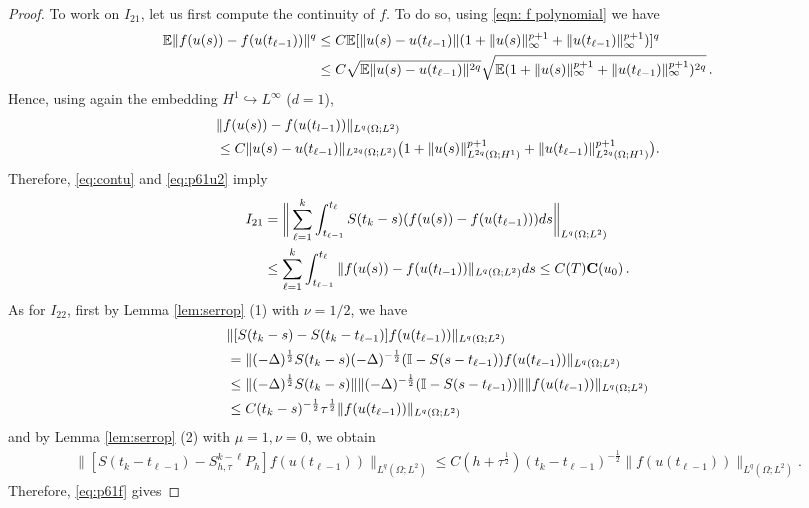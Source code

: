 \documentclass[reqno, 11pt]{amsart}
\theoremstyle{plain}
\theoremstyle{definition}
\theoremstyle{remark}
\numberwithin{equation}{section}
\numberwithin{theorem}{section}
\newcommand{\con}{\mathbf{C}}
\begin{document}
{\begin{proof}
To work on $I_{21}$,  let us first compute the continuity of $f$. To do so, using  \eqref{eqn: f polynomial} we have
\begin{align}
\mathbb{E}\|f(u(s))-f(u(t_{\ell-1}))\|^q &\leq 
C\mathbb{E}[\|u(s)-u(t_{\ell-1})\|(1+\|u(s)\|_\infty^{p+1}+\|u(t_{\ell-1})\|_\infty^{p+1})]^q\notag\\
&\leq C\sqrt{\mathbb{E}\|u(s)-u(t_{\ell-1})\|^{2q}}\sqrt{\mathbb{E}(1+\|u(s)\|_\infty^{p+1}+\|u(t_{\ell-1})\|_\infty^{p+1})^{2q}} \,.
\end{align}
Hence, using again the embedding $H^1\hookrightarrow L^\infty$ ($d=1$), 
\begin{align}
&\|f(u(s))-f(u(t_{l-1}))\|_{L^q(\Omega;L^2)} \\
&\leq C\|u(s)-u(t_{\ell-1})\|_{L^{2q}(\Omega;L^2)}\big(1+\|u(s)\|_{L^{2q}(\Omega; H^1)}^{p+1}+\|u(t_{\ell-1})\|_{L^{2q}(\Omega; H^1)}^{p+1}\big). \notag
\end{align}
Therefore,  \eqref{eq:contu} and \eqref{eq:p61u2} imply
\begin{align*}%
I_{21}&=\bigg\|\sum\limits_{\ell=1}^k\int_{t_{\ell-1}}^{t_\ell} S(t_k-s)(f(u(s))-f(u(t_{\ell-1})))ds\bigg\|_{L^q(\Omega;L^2)}\notag\\
 &\leq \sum\limits_{\ell=1}^k\int_{t_{\ell-1}}^{t_\ell} \|f(u(s))-f(u(t_{l-1}))\|_{L^q(\Omega;L^2)}ds\leq C(T) \con(u_0) \,. 
\end{align*}
As for  $I_{22}$,  first  
by Lemma \ref{lem:serrop} (1) with $\nu=1/2$, we  have
\begin{align}\label{eq:estfu1}
&\|[S(t_k-s)-S(t_k-t_{\ell-1})]f(u(t_{\ell-1}))\|_{L^q(\Omega;L^2)} \notag\\
&=\|(-\Delta)^{\frac{1}{2}}S(t_k-s)(-\Delta)^{-\frac{1}{2}}(\mathbb{I}-S(s-t_{\ell-1}))f(u(t_{\ell-1}))\|_{L^q(\Omega;L^2)}\notag\\
&\leq \|(-\Delta)^{\frac{1}{2}}S(t_k-s)\| \|(-\Delta)^{-\frac{1}{2}}(\mathbb{I}-S(s-t_{\ell-1}))\| \|f(u(t_{\ell-1}))\|_{L^q(\Omega;L^2)}\notag\\
&\leq C(t_k-s)^{-\frac{1}{2}}\tau^{\frac{1}{2}}\|f(u(t_{\ell-1}))\|_{L^q(\Omega;L^2)}
\end{align}
and by Lemma \ref{lem:serrop} (2) with $\mu=1, \nu=0$, we obtain
\begin{align}\label{eq:estfu2}
 \|[S(t_k-t_{\ell-1})-S_{h,\tau}^{k-\ell}P_h]f(u(t_{\ell-1}))\|_{L^q(\Omega;L^2)}\leq C(h+\tau^{\frac{1}{2}})(t_k-t_{\ell-1})^{-\frac{1}{2}}\|f(u(t_{\ell-1}))\|_{L^q(\Omega;L^2)}.
\end{align}
Therefore, \eqref{eq:p61f} gives

\end{proof}}
\end{document}
